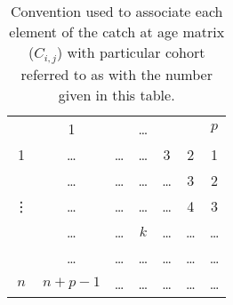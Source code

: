 \begin{table}[ht]
\begin{center}

\begin{tabular}{c|cccccc}
 \multicolumn{1}{c}{} & 1 & & \dots & & & $p$ \\
\cmidrule(r){2-7}
 1      & \dots   & \dots & \dots & 3     & 2       & 1      \\
        & \dots   & \dots & \dots & \dots & 3       & 2      \\
\vdots  & \dots   & \dots & \dots & \dots & 4       & 3      \\
        & \dots   & \dots & $k$   & \dots & \dots   & \dots  \\
        & \dots   & \dots & \dots & \dots & \dots   & \dots  \\
$n$     & $n+p-1$ & \dots & \dots & \dots & \dots   & \dots  \\
\end{tabular}

\caption{Convention used to associate each element of the catch at age matrix ($C_{i,j}$) with particular cohort referred to as with the number given in this table.}
\label{Tab:Cohorts}


\end{center}
\end{table}


